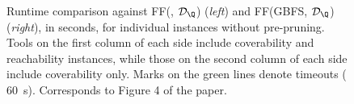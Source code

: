 \begin{figure}[h]
  \hspace*{-10pt}%
  \begin{minipage}[t]{0.29\textwidth}%
    \centering
  \end{minipage}%
  \hspace*{-20pt}
  \begin{minipage}[t]{0.29\textwidth}%
    \centering
  \end{minipage}%
  \vrule
  \hspace*{-5pt}
  \begin{minipage}[t]{0.29\textwidth}%
    \centering
  \end{minipage}%
  \hspace*{-20pt}
  \begin{minipage}[t]{0.29\textwidth}%
    \centering
  \end{minipage}%
  \vspace*{-1pt}
  
\caption{Runtime comparison against \textsc{FF(\astar,
    $\mathcal{D}_{\Q}$)} (\emph{left}) and \textsc{FF(GBFS,
    $\mathcal{D}_{\Q}$)} (\emph{right}), in seconds, for individual
  instances without pre-pruning. Tools on the first column of each
  side include coverability and reachability instances, while those on
  the second column of each side include coverability only. Marks on
  the \textcolor{green!70!black}{green} lines denote timeouts
  ($60$~s). Corresponds to Figure 4 of the paper.}\label{fig:comparisons}
\end{figure}
